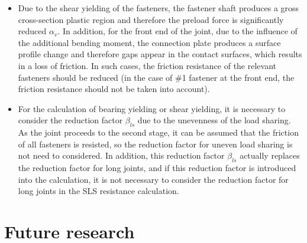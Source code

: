 \begin{itemize}
\item Due to the shear yielding of the fasteners, the fastener shaft produces a gross cross-section plastic region and therefore the preload force is significantly reduced $\alpha_v$. In addition, for the front end of the joint, due to the influence of the additional bending moment, the connection plate produces a surface profile change and therefore gaps appear in the contact surfaces, which results in a loss of friction. In such cases, the friction resistance of the relevant fasteners should be reduced (in the case of \#1 fastener at the front end, the friction resistance should not be taken into account).

\item For the calculation of bearing yielding or shear yielding, it is necessary to consider the reduction factor $\beta_{ls}$ due to the unevenness of the load sharing. As the joint proceeds to the second stage, it can be assumed that the friction of all fasteners is resisted, so the reduction factor for uneven load sharing is not need to considered. In addition, this reduction factor $\beta_{ls}$ actually replaces the reduction factor for long joints, and if this reduction factor is introduced into the calculation, it is not necessary to consider the reduction factor for long joints in the SLS resistance calculation.

\end{itemize}





\section{Future research}


